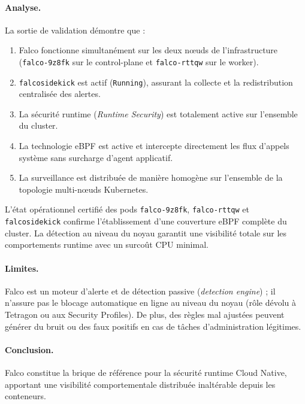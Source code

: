 \paragraph{Analyse.}
La sortie de validation démontre que :
\begin{enumerate}
    \item Falco fonctionne simultanément sur les deux nœuds de l'infrastructure (\texttt{falco-9z8fk} sur le control-plane et \texttt{falco-rttqw} sur le worker).
    \item \texttt{falcosidekick} est actif (\texttt{Running}), assurant la collecte et la redistribution centralisée des alertes.
    \item La sécurité runtime (\textit{Runtime Security}) est totalement active sur l'ensemble du cluster.
    \item La technologie eBPF est active et intercepte directement les flux d'appels système sans surcharge d'agent applicatif.
    \item La surveillance est distribuée de manière homogène sur l'ensemble de la topologie multi-nœuds Kubernetes.
\end{enumerate}

\begin{tcolorbox}[colback=LightGray!30, colframe=clrBlue, arc=3pt, title={\small\bfseries Synthèse d'analyse critique — Falco Runtime}]
L'état opérationnel certifié des pods \texttt{falco-9z8fk}, \texttt{falco-rttqw} et \texttt{falcosidekick} confirme l'établissement d'une couverture eBPF complète du cluster. La détection au niveau du noyau garantit une visibilité totale sur les comportements runtime avec un surcoût CPU minimal.
\end{tcolorbox}

\paragraph{Limites.}
Falco est un moteur d'alerte et de détection passive (\textit{detection engine}) ; il n'assure pas le blocage automatique en ligne au niveau du noyau (rôle dévolu à Tetragon ou aux Security Profiles). De plus, des règles mal ajustées peuvent générer du bruit ou des faux positifs en cas de tâches d'administration légitimes.

\paragraph{Conclusion.}
Falco constitue la brique de référence pour la sécurité runtime Cloud Native, apportant une visibilité comportementale distribuée inaltérable depuis les conteneurs.

